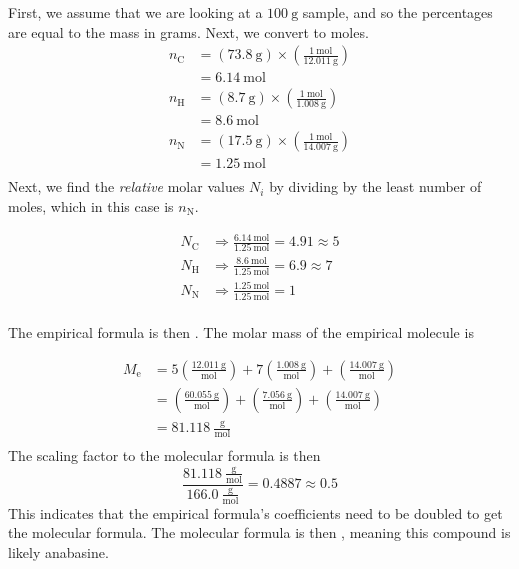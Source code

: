 \documentclass[11pt]{scrartcl}
\begin{document}
\noindent First, we assume that we are looking at a $100\ \text{g}$ sample, and so the percentages are equal to the mass in grams.
Next, we convert to moles.
\begin{align*}
    n_{\text{C}} &= \left ( 73.8\ \text{g} \right) \times \left ( \frac{1\ \text{mol}}{12.011\ \text{g}} \right) \\
    &= 6.14\ \text{mol} \\
    n_{\text{H}} &= \left ( 8.7\ \text{g} \right) \times \left ( \frac{1\ \text{mol}}{1.008\ \text{g}} \right) \\
    &= 8.6\ \text{mol} \\
    n_{\text{N}} &= \left ( 17.5\ \text{g} \right) \times \left ( \frac{1\ \text{mol}}{14.007\ \text{g}} \right) \\
    &= 1.25\ \text{mol} \\
\end{align*}
Next, we find the \textit{relative} molar values $N_i$ by dividing by the least number of moles, which in this case is $n_{\text{N}}$.

\begin{align*}
    N_{\text{C}} &\Rightarrow \frac{6.14\ \text{mol}}{1.25\ \text{mol}} = 4.91 \approx 5\\
    N_{\text{H}} &\Rightarrow \frac{8.6\ \text{mol}}{1.25\ \text{mol}} = 6.9 \approx 7 \\
    N_{\text{N}} &\Rightarrow \frac{1.25\ \text{mol}}{1.25\ \text{mol}} = 1 \\
\end{align*}

The empirical formula is then .
The molar mass of the empirical molecule is

\begin{align*}
    M_{\text{e}} &= 5 \left ( \frac{12.011\ \text{g}}{\text{mol}} \right) + 7 \left ( \frac{1.008\ \text{g}}{\text{mol}} \right) + \left ( \frac{14.007\ \text{g}}{\text{mol}} \right) \\
    &= \left ( \frac{60.055\ \text{g}}{\text{mol}} \right) + \left ( \frac{7.056\ \text{g}}{\text{mol}} \right) + \left (\frac{14.007\ \text{g}}{\text{mol}} \right) \\
    &= 81.118\ \frac{\text{g}}{\text{mol}}\\
\end{align*}
The scaling factor to the molecular formula is then
$$\frac{81.118\ \frac{\text{g}}{\text{mol}}}{166.0\ \frac{\text{g}}{\text{mol}}} = 0.4887 \approx 0.5$$
This indicates that the empirical formula's coefficients need to be doubled to get the molecular formula.
The molecular formula is then , meaning this compound is likely anabasine.
\end{document}
